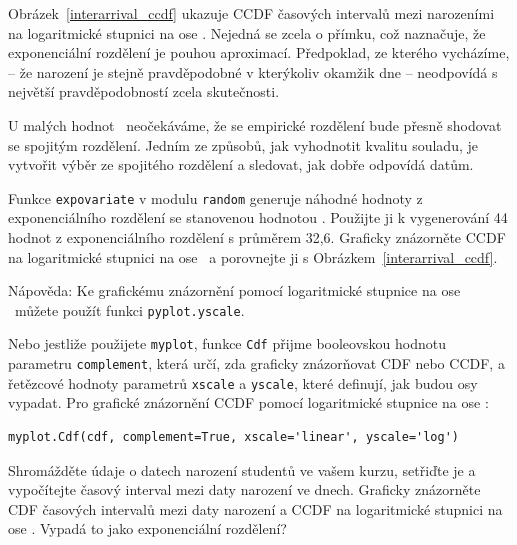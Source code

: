 \documentclass[12pt]{book}
\begin{document}
Obrázek~\ref{interarrival_ccdf} ukazuje CCDF časových intervalů mezi narozeními na logaritmické stupnici na ose
\y.  Nejedná se zcela o přímku, což naznačuje, že exponenciální rozdělení je pouhou aproximací.
Předpoklad, ze kterého vycházíme, -- že narození je stejně pravděpodobné v kterýkoliv okamžik dne -- neodpovídá s největší pravděpodobností zcela skutečnosti.

\begin{exercise}
U malých hodnot \n~neočekáváme, že se empirické rozdělení bude přesně shodovat se spojitým rozdělení. Jedním ze způsobů, jak vyhodnotit kvalitu souladu, je vytvořit výběr ze spojitého rozdělení a sledovat, jak dobře odpovídá datům.

Funkce {\tt expovariate} v modulu {\tt random} generuje náhodné hodnoty z exponenciálního rozdělení se stanovenou hodnotou \mylambda.  Použijte ji k vygenerování 44 hodnot z exponenciálního rozdělení s průměrem 32,6. Graficky znázorněte CCDF na logaritmické stupnici na ose \y~a porovnejte ji s Obrázkem~\ref{interarrival_ccdf}.

Nápověda: Ke grafickému znázornění pomocí logaritmické stupnice na ose \y~můžete použít funkci {\tt pyplot.yscale}.


Nebo jestliže použijete {\tt myplot}, funkce {\tt Cdf} přijme booleovskou hodnotu parametru {\tt complement}, která určí, zda graficky znázorňovat CDF nebo CCDF, a řetězcové hodnoty parametrů {\tt xscale} a {\tt yscale}, které definují, jak budou osy vypadat. Pro grafické znázornění CCDF pomocí logaritmické stupnice na ose \y:
%
\begin{verbatim}
myplot.Cdf(cdf, complement=True, xscale='linear', yscale='log')
\end{verbatim}


\end{exercise}

\begin{exercise}
Shromážděte údaje o datech narození studentů ve vašem kurzu, setřiďte je a vypočítejte časový interval mezi daty narození ve dnech. Graficky znázorněte CDF časových intervalů mezi daty narození a CCDF na logaritmické stupnici na ose \y.  Vypadá to jako exponenciální rozdělení?

\end{exercise}
\end{document}
